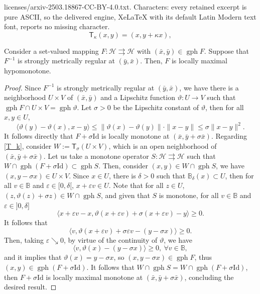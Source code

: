 \documentclass[10pt,a4paper]{amsart}
\newcommand{\gph}{\operatorname{gph}}
\newcommand{\tto}{\rightrightarrows}
\renewcommand{\H}{\mathcal{H}}
\renewcommand{\epsilon}{\varepsilon}
\begin{document}
licenses/arxiv-2503.18867-CC-BY-4.0.txt. Characters: every retained excerpt is pure ASCII, so the delivered engine, XeLaTeX with its default Latin Modern text font, reports no missing character.
    \begin{equation}\label{T_k}
        \mathsf{T}_\kappa(x,y) = (x,y+\kappa x),
    \end{equation}

	\begin{proposition}\label{prop-lips-max-hypo}
		Consider a set-valued mapping $F\colon \H\tto \H$ with $(\bar x,\bar y)\in \gph F$. Suppose that $F^{-1}$ is strongly metrically regular at $(\bar y,\bar x)$. Then, $F$ is locally maximal hypomonotone.
	\end{proposition} 

	\begin{proof}
		Since $F^{-1}$ is strongly metrically regular at $(\bar y,\bar x)$, we have there is a neighborhood $U\times V$ of $(\bar x,\bar y)$ and a Lipschitz function $\vartheta\colon U\to V$ such that $\gph F\cap U\times V = \gph \vartheta$. Let $\sigma>0$ be the Lipschitz constant of $\vartheta$, then for all $x,y\in U$, 
		\begin{equation*}\label{eqn_lips_hypo}
			\langle \vartheta(y)-\vartheta(x),x-y\rangle\leq \| \vartheta(x)-\vartheta(y)\|\cdot \|x-y\|\leq \sigma\|x-y\|^2.
		\end{equation*}
		It follows directly that $F+\sigma\text{Id}$ is locally monotone at $(\bar x,\bar y + \sigma \bar x)$. Regarding \eqref{T_k}, consider $W := \mathsf{T}_{\sigma}(U\times V)$, which is an open neighborhood of $(\bar x,\bar y + \sigma \bar x)$. Let us take a monotone operator $S\colon \H\tto \H$ such that $W\cap \gph (F+\sigma\text{Id})\subset \gph S$. Then, consider $(x,y)\in W\cap \gph S$, we have $(x,y-\sigma x)\in U\times V$. Since $x\in U$, there is $\delta>0$ such that $\mathbb{B}_\delta(x)\subset U$, then for all $v\in \mathbb{B}$ and $\epsilon\in [0,\delta[$, $x+\epsilon v\in U$. Note that for all $z\in U$, $(z,\vartheta(z)+\sigma z)\in W\cap \gph S$, and given that $S$ is monotone, for all $v\in \mathbb{B}$ and $\epsilon\in ]0,\delta]$
		\begin{equation*}
			\langle x+\epsilon v-x,\vartheta(x+\epsilon v)+\sigma (x+\epsilon v) -y \rangle\geq 0.
		\end{equation*}
		It follows that
		\begin{equation*}
			\langle v,\vartheta(x+\epsilon v) + \sigma\epsilon v-(y-\sigma x)\rangle\geq 0.
		\end{equation*}
		Then, taking $\epsilon\searrow 0$, by virtue of the continuity of $\vartheta$, we have $$\langle v,\vartheta(x)-(y-\sigma x)\rangle\geq 0, \ \forall v\in \mathbb{B},$$ and it implies that $\vartheta(x) = y-\sigma x$, so $(x,y-\sigma x)\in \gph F$, thus $(x,y)\in \gph(F+\sigma\text{Id})$. It follows that $W\cap \gph S = W\cap \gph (F+\sigma\text{Id})$, then $F+\sigma \text{Id}$ is locally maximal monotone at $(\bar x,\bar y+\sigma \bar x)$, concluding the desired result.
	\end{proof}
\end{document}
